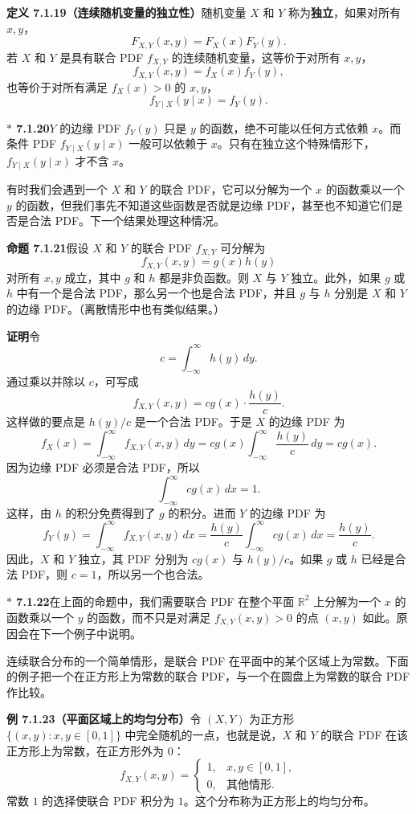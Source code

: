 \documentclass[UTF8, 12pt, fontset=fandol, oneside]{ctexart}
\newcommand{\biohazard}{\ensuremath{\ast}}
\begin{document}
\noindent\textbf{定义 7.1.19（连续随机变量的独立性）}\quad 随机变量 $X$ 和 $Y$ 称为\textbf{独立}，如果对所有 $x,y$，
\[
  F_{X,Y}(x,y)=F_X(x)F_Y(y).
\]
若 $X$ 和 $Y$ 是具有联合 PDF $f_{X,Y}$ 的连续随机变量，这等价于对所有 $x,y$，
\[
  f_{X,Y}(x,y)=f_X(x)f_Y(y),
\]
也等价于对所有满足 $f_X(x)>0$ 的 $x,y$，
\[
  f_{Y\mid X}(y\mid x)=f_Y(y).
\]

\noindent\textbf{$\biohazard$ 7.1.20}\quad $Y$ 的边缘 PDF $f_Y(y)$ 只是 $y$ 的函数，绝不可能以任何方式依赖 $x$。而条件 PDF $f_{Y\mid X}(y\mid x)$ 一般可以依赖于 $x$。只有在独立这个特殊情形下，$f_{Y\mid X}(y\mid x)$ 才不含 $x$。

有时我们会遇到一个 $X$ 和 $Y$ 的联合 PDF，它可以分解为一个 $x$ 的函数乘以一个 $y$ 的函数，但我们事先不知道这些函数是否就是边缘 PDF，甚至也不知道它们是否是合法 PDF。下一个结果处理这种情况。

\noindent\textbf{命题 7.1.21}\quad 假设 $X$ 和 $Y$ 的联合 PDF $f_{X,Y}$ 可分解为
\[
  f_{X,Y}(x,y)=g(x)h(y)
\]
对所有 $x,y$ 成立，其中 $g$ 和 $h$ 都是非负函数。则 $X$ 与 $Y$ 独立。此外，如果 $g$ 或 $h$ 中有一个是合法 PDF，那么另一个也是合法 PDF，并且 $g$ 与 $h$ 分别是 $X$ 和 $Y$ 的边缘 PDF。（离散情形中也有类似结果。）

\noindent\textbf{证明}\quad 令
\[
  c=\int_{-\infty}^{\infty}h(y)\,dy.
\]
通过乘以并除以 $c$，可写成
\[
  f_{X,Y}(x,y)=c g(x)\cdot \frac{h(y)}{c}.
\]
这样做的要点是 $h(y)/c$ 是一个合法 PDF。于是 $X$ 的边缘 PDF 为
\[
  f_X(x)=\int_{-\infty}^{\infty} f_{X,Y}(x,y)\,dy
  =c g(x)\int_{-\infty}^{\infty}\frac{h(y)}{c}\,dy
  =c g(x).
\]
因为边缘 PDF 必须是合法 PDF，所以
\[
  \int_{-\infty}^{\infty} c g(x)\,dx=1.
\]
这样，由 $h$ 的积分免费得到了 $g$ 的积分。进而 $Y$ 的边缘 PDF 为
\[
  f_Y(y)=\int_{-\infty}^{\infty} f_{X,Y}(x,y)\,dx
  =\frac{h(y)}{c}\int_{-\infty}^{\infty}c g(x)\,dx
  =\frac{h(y)}{c}.
\]
因此，$X$ 和 $Y$ 独立，其 PDF 分别为 $c g(x)$ 与 $h(y)/c$。如果 $g$ 或 $h$ 已经是合法 PDF，则 $c=1$，所以另一个也合法。

\noindent\textbf{$\biohazard$ 7.1.22}\quad 在上面的命题中，我们需要联合 PDF 在整个平面 $\mathbb{R}^2$ 上分解为一个 $x$ 的函数乘以一个 $y$ 的函数，而不只是对满足 $f_{X,Y}(x,y)>0$ 的点 $(x,y)$ 如此。原因会在下一个例子中说明。

连续联合分布的一个简单情形，是联合 PDF 在平面中的某个区域上为常数。下面的例子把一个在正方形上为常数的联合 PDF，与一个在圆盘上为常数的联合 PDF 作比较。

\noindent\textbf{例 7.1.23（平面区域上的均匀分布）}\quad 令 $(X,Y)$ 为正方形 $\{(x,y):x,y\in[0,1]\}$ 中完全随机的一点，也就是说，$X$ 和 $Y$ 的联合 PDF 在该正方形上为常数，在正方形外为 $0$：
\[
  f_{X,Y}(x,y)=
  \begin{cases}
    1, & x,y\in[0,1],\\
    0, & \text{其他情形}.
  \end{cases}
\]
常数 $1$ 的选择使联合 PDF 积分为 $1$。这个分布称为正方形上的均匀分布。
\end{document}
